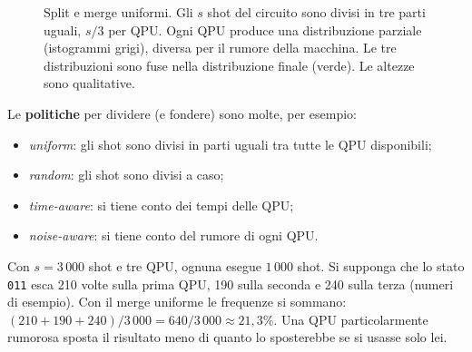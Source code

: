 \begin{figure}[ht]
\centering
{}
\caption{Split e merge uniformi. Gli $s$ shot del circuito sono divisi in tre parti uguali, $s/3$ per QPU. Ogni QPU
produce una distribuzione parziale (istogrammi grigi), diversa per il rumore della macchina. Le tre distribuzioni sono
fuse nella distribuzione finale (verde). Le altezze sono qualitative.}
\label{fig:qse-split}
\end{figure}

Le \textbf{politiche} per dividere (e fondere) sono molte, per esempio:
\begin{itemize}
  \item \emph{uniform}: gli shot sono divisi in parti uguali tra tutte le QPU disponibili;
  \item \emph{random}: gli shot sono divisi a caso;
  \item \emph{time-aware}: si tiene conto dei tempi delle QPU;
  \item \emph{noise-aware}: si tiene conto del rumore di ogni QPU.
\end{itemize}

\begin{esempio}
Con $s = 3\,000$ shot e tre QPU, ognuna esegue $1\,000$ shot. Si supponga che lo stato \texttt{011} esca 210 volte sulla
prima QPU, 190 sulla seconda e 240 sulla terza (numeri di esempio). Con il merge uniforme le frequenze si sommano:
$(210 + 190 + 240)/3\,000 = 640/3\,000 \approx 21{,}3\%$. Una QPU particolarmente rumorosa sposta il risultato meno di
quanto lo sposterebbe se si usasse solo lei.
\end{esempio}

